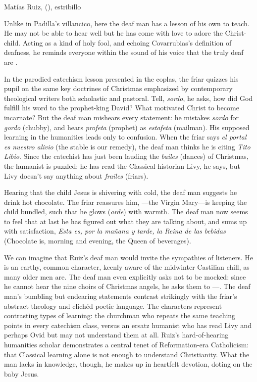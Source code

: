 {Matías Ruiz, 
(), estribillo} 

Unlike in Padilla's villancico, here the deaf man has a lesson of his own to
teach.
He may not be able to hear well but he has come with love to adore the
Christ-child.
Acting as a kind of holy fool, and echoing Covarrubias's definition of deafness,
he reminds everyone within the sound of his voice that the truly deaf are
.

In the parodied catechism lesson presented in the coplas, the friar quizzes his
pupil on the same key doctrines of Christmas emphasized by contemporary
theological writers both scholastic and pastoral.%
    \Autocite[]{Cashner:PhD} %
Tell, \emph{sordo}, he asks, how did God fulfill his word to the prophet-king
David?  
What motivated Christ to become incarnate? 
But the deaf man mishears every statement: he mistakes \emph{sordo} for
\emph{gordo} (chubby), and hears \emph{profeta} (prophet) as \emph{estafeta}
(mailman).
His supposed learning in the humanities leads only to confusion.
When the friar says \emph{el portal es nuestro alivio} (the stable is our
remedy), the deaf man thinks he is citing \emph{Tito Libio}.
Since the catechist has just been lauding the \emph{bailes} (dances) of
Christmas, the humanist is puzzled: he has read the Classical historian Livy, he
says, but Livy doesn't say anything about \emph{frailes} (friars).

Hearing that the child Jesus is shivering with cold, the deaf man suggests he
drink hot chocolate.
The friar reassures him, ---the Virgin Mary---is keeping the
child bundled, such that he glows (\emph{arde}) with warmth.
The deaf man now seems to feel that at last he has figured out what they are
talking about, and sums up with satisfaction, \emph{Esta es, por la mañana y
tarde, la Reina de las bebidas} (Chocolate is, morning and evening, the Queen of
beverages).

We can imagine that Ruiz's deaf man would invite the sympathies of listeners.
He is an earthy, common character, keenly aware of the midwinter Castilian
chill, as many older men are.
The deaf man even explicitly asks not to be mocked: since he cannot hear the
nine choirs of Christmas angels, he asks them to ---.
The deaf man's bumbling but endearing statements contrast strikingly with the
friar's abstract theology and clichéd poetic language.
The characters represent contrasting types of learning: the churchman who
repeats the same teaching points in every catechism class, versus an ersatz
humanist who has read Livy and perhaps Ovid but may not understand them at all.
Ruiz's hard-of-hearing humanities scholar demonstrates a central tenet of
Reformation-era Catholicism: that Classical learning alone is not enough to
understand Christianity.%
    \Autocite[206]{Erasmus:Dolan}
What the man lacks in knowledge, though, he makes up in heartfelt devotion,
doting on the baby Jesus.

